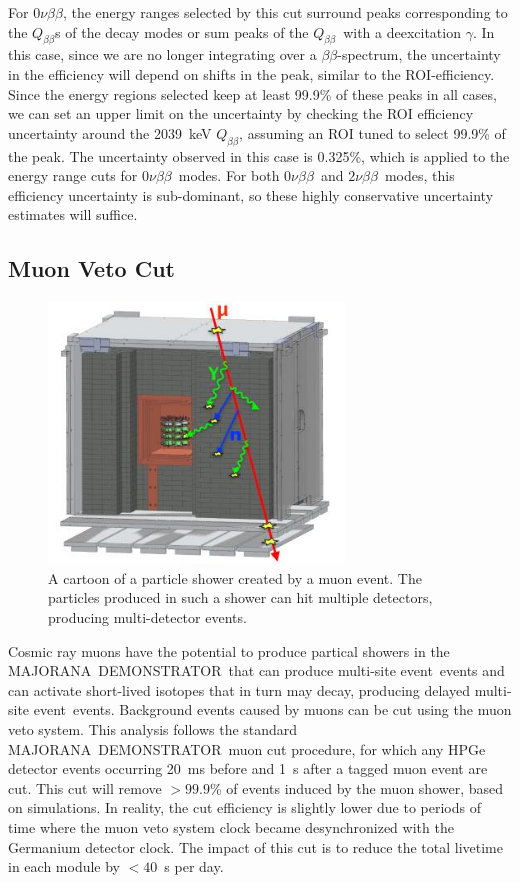 \documentclass[notitlepage,rmp,aps,10pt]{revtex4-1}
\newcommand{\MJ}{M{\footnotesize AJORANA}}
\newcommand{\Demo}{D{\footnotesize EMON\-STRAT\-OR}}
\newcommand{\MJD}{\MJ\ \Demo}
\newcommand{\bb}{${\beta \beta}$}
\newcommand{\znbb}{${0 \nu \beta \beta}$}
\newcommand{\tnbb}{${2 \nu \beta \beta}$}
\newcommand{\Qbb}{$Q_{\beta\beta}$}
\newcommand{\msmd}{multi-site event}
\begin{document}
For \znbb, the energy ranges selected by this cut surround peaks corresponding to the \Qbb s of the decay modes or sum peaks of the \Qbb\ with a deexcitation $\gamma$.
In this case, since we are no longer integrating over a \bb -spectrum, the uncertainty in the efficiency will depend on shifts in the peak, similar to the ROI-efficiency.
Since the energy regions selected keep at least 99.9\% of these peaks in all cases, we can set an upper limit on the uncertainty by checking the ROI efficiency uncertainty around the 2039~keV \Qbb, assuming an ROI tuned to select 99.9\% of the peak.
The uncertainty observed in this case is 0.325\%, which is applied to the energy range cuts for \znbb\ modes.
For both \znbb\ and \tnbb\ modes, this efficiency uncertainty is sub-dominant, so these highly conservative uncertainty estimates will suffice.

\subsection{Muon Veto Cut}
\begin{figure}
  \centering
  \includegraphics[width=0.7\textwidth]{muonevent}
  \caption[Example muon event]{\label{fig:muonevent}
    A cartoon of a particle shower created by a muon event. The particles produced in such a shower can hit multiple detectors, producing multi-detector events.
  }
\end{figure}
Cosmic ray muons have the potential to produce partical showers in the \MJD\ that can produce \msmd\ events and can activate short-lived isotopes that in turn may decay, producing delayed \msmd\ events.
Background events caused by muons can be cut using the muon veto system.
This analysis follows the standard \MJD\ muon cut procedure, for which any HPGe detector events occurring 20~ms before and 1~s after a tagged muon event are cut.
This cut will remove $>99.9$\% of events induced by the muon shower, based on simulations\cite{2015wiseman}.
In reality, the cut efficiency is slightly lower due to periods of time where the muon veto system clock became desynchronized with the Germanium detector clock.
The impact of this cut is to reduce the total livetime in each module by $<40$~s per day\cite{2015wiseman}.
\end{document}
